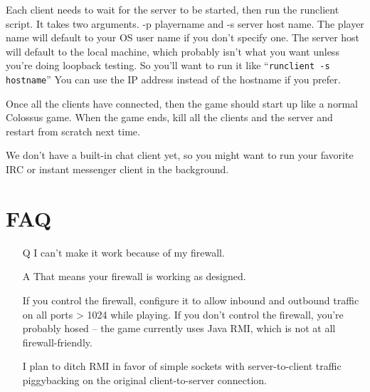 \documentclass{article}
\begin{document}
Each client needs to wait for the server to be started, then run
the runclient script.  It takes two arguments.  -p playername and
-s server host name.  The player name will default to your OS user
name if you don't specify one.  The server host will default to the
local machine, which probably isn't what you want unless you're doing
loopback testing.  So you'll want to run it like
``\texttt{runclient -s hostname}''
You can use the IP address instead of the hostname if you prefer.

Once all the clients have connected, then the game should start up like
a normal Colossus game.  When the game ends, kill all the clients and
the server and restart from scratch next time.

We don't have a built-in chat client yet, so you might want to run
your favorite IRC or instant messenger client in the background. 


\section{FAQ}

\begin{itemize}

\item[Q] I can't make it work because of my firewall.

\item[A] That means your firewall is working as designed.

   If you control the firewall, configure it to allow inbound and 
   outbound traffic on all ports > 1024 while playing.  If you don't 
   control the firewall, you're probably hosed -- the game currently
   uses Java RMI, which is not at all firewall-friendly.
   
   I plan to ditch RMI in favor of simple sockets with server-to-client 
   traffic piggybacking on the original client-to-server connection.

\end{itemize}
\end{document}
